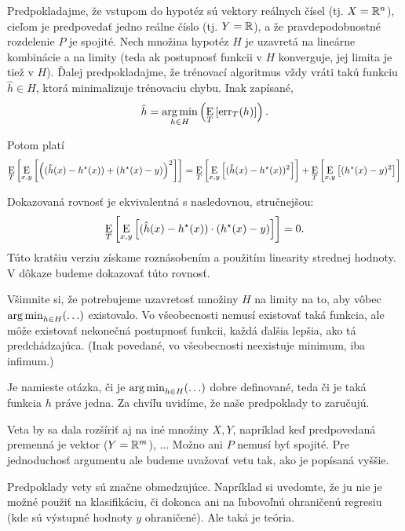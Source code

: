 \begin{theorem} \label{theorem:proj1}
  Predpokladajme, že vstupom do hypotéz sú vektory reálnych čísel
  (tj. $X = \mathbb{R}^n$), cieľom je predpovedať jedno reálne číslo
  (tj. $Y = \mathbb{R}$), a že pravdepodobnostné rozdelenie $P$ je spojité.
  Nech množina hypotéz $H$ je uzavretá na lineárne kombinácie a na
  limity (teda ak postupnosť funkcii v $H$ konverguje, jej limita
  je tiež v $H$).
  Ďalej predpokladajme, že trénovací algoritmus vždy vráti takú funkciu
  $\hat{h} \in H$, ktorá minimalizuje trénovaciu chybu. Inak zapísané,
  $$\hat{h} = \operatorname*{arg\,min}_{h \in H} \left( \operatorname*{\mathrm{E}}_T \left[ \mathrm{err}_T(h) \right] \right).$$
  
  Potom platí
  $$\operatorname*{\mathrm{E}}_T \left[ \operatorname*{\mathrm{E}}_{x,y} \left[ \left( (\hat{h}(x) - h^\star(x)) + (h^\star(x) - y) \right)^2 \right] \right] = \operatorname*{\mathrm{E}}_T \left[ \operatorname*{\mathrm{E}}_{x,y} \left[ (\hat{h}(x) - h^\star(x))^2 \right] \right] + \operatorname*{\mathrm{E}}_T \left[ \operatorname*{\mathrm{E}}_{x,y} \left[ (h^\star(x) - y)^2 \right] \right]$$
\end{theorem}
\begin{remark}
  Dokazovaná rovnosť je ekvivalentná s nasledovnou, stručnejšou:
  $$\operatorname*{\mathrm{E}}_T \left[ \operatorname*{\mathrm{E}}_{x, y} \left[ (\hat{h}(x) - h^\star(x)) \cdot (h^\star(x) - y) \right] \right] = 0.$$
  Túto kratšiu verziu získame roznásobením a použitím linearity strednej
  hodnoty. V dôkaze budeme dokazovať túto rovnosť.
\end{remark}
\begin{remark}
  Všimnite si, že potrebujeme uzavretosť množiny $H$ na limity na to,
  aby vôbec $\operatorname*{arg\,min}_{h \in H} (\ldots)$ existovalo. Vo všeobecnosti
  nemusí existovať taká funkcia, ale môže existovať nekonečná postupnosť
  funkcii, každá ďalšia lepšia, ako tá predchádzajúca. (Inak povedané,
  vo všeobecnosti neexistuje minimum, iba infimum.)
\end{remark}
\begin{remark}
  Je namieste otázka, či je $\operatorname*{arg\,min}_{h \in H} (\ldots)$ dobre definované,
  teda či je taká funkcia $h$ práve jedna. Za chvíľu uvidíme, že naše
  predpoklady to zaručujú.
\end{remark}
\begin{remark}
  Veta by sa dala rozšíriť aj na iné množiny $X, Y$, napríklad keď
  predpovedaná premenná je vektor ($Y = \mathbb{R}^m$), ... Možno ani $P$
  nemusí byť spojité. Pre jednoduchosť argumentu ale budeme uvažovať
  vetu tak, ako je popísaná vyššie.
\end{remark}
\begin{remark}
  Predpoklady vety sú značne obmedzujúce. Napríklad si uvedomte, že
  ju nie je možné použiť na klasifikáciu, či dokonca ani na ľubovoľnú
  ohraničenú regresiu (kde sú výstupné hodnoty $y$ ohraničené). Ale
  taká je teória.
\end{remark}


